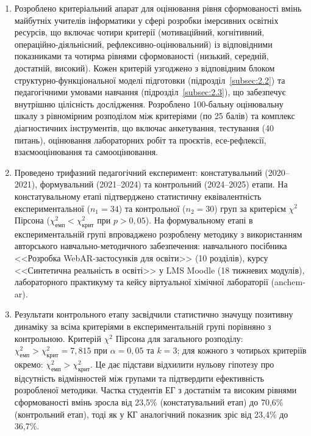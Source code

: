 \begin{enumerate}
\item Розроблено критеріальний апарат для оцінювання рівня сформованості вмінь майбутніх учителів інформатики у сфері розробки імерсивних освітніх ресурсів, що включає чотири критерії (мотиваційний, когнітивний, операційно-діяльнісний, рефлексивно-оцінювальний) із відповідними показниками та чотирма рівнями сформованості (низький, середній, достатній, високий). Кожен критерій узгоджено з відповідним блоком структурно-функціональної моделі підготовки (підрозділ~\ref{subsec:2.2}) та педагогічними умовами навчання (підрозділ~\ref{subsec:2.3}), що забезпечує внутрішню цілісність дослідження. Розроблено 100-бальну оцінювальну шкалу з рівномірним розподілом між критеріями (по 25 балів) та комплекс діагностичних інструментів, що включає анкетування, тестування (40 питань), оцінювання лабораторних робіт та проєктів, есе-рефлексії, взаємооцінювання та самооцінювання.

\item Проведено трифазний педагогічний експеримент: констатувальний (2020--2021), формувальний (2021--2024) та контрольний (2024--2025) етапи. На констатувальному етапі підтверджено статистичну еквівалентність експериментальної ($n_1 = 34$) та контрольної ($n_2 = 30$) груп за критерієм $\chi^2$ Пірсона ($\chi^2_{\text{емп}} < \chi^2_{\text{крит}}$ при $p > 0{,}05$). На формувальному етапі в експериментальній групі впроваджено розроблену методику з використанням авторського навчально-методичного забезпечення: навчального посібника <<Розробка WebAR-застосунків для освіти>> (10 розділів), курсу <<Синтетична реальність в освіті>> у LMS Moodle (18 тижневих модулів), лабораторного практикуму та кейсу віртуальної хімічної лабораторії (anchem-ar).

\item Результати контрольного етапу засвідчили статистично значущу позитивну динаміку за всіма критеріями в експериментальній групі порівняно з контрольною. Критерій $\chi^2$ Пірсона для загального розподілу: $\chi^2_{\text{емп}} > \chi^2_{\text{крит}} = 7{,}815$ при $\alpha = 0{,}05$ та $k = 3$; для кожного з чотирьох критеріїв окремо: $\chi^2_{\text{емп}} > \chi^2_{\text{крит}}$. Це дає підстави відхилити нульову гіпотезу про відсутність відмінностей між групами та підтвердити ефективність розробленої методики. Частка студентів ЕГ з достатнім та високим рівнями сформованості вмінь зросла від 23,5\% (констатувальний етап) до 70,6\% (контрольний етап), тоді як у КГ аналогічний показник зріс від 23,4\% до 36,7\%.


\end{enumerate}
